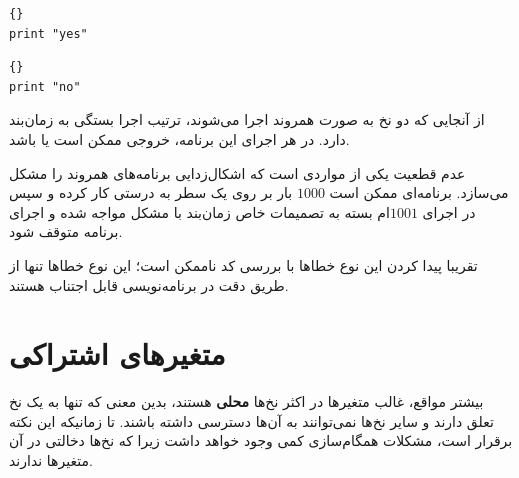 \documentclass{book}
\begin{document}
\begin{latin}
\begin{minipage}[t]{2in}
\begin{latin}
\begin{lstlisting}[title=\rl{نخ \lr{A}}]{}
print "yes"
\end{lstlisting}
\end{latin}
\end{minipage}
\hfill
\begin{minipage}[t]{2in}
\begin{latin}
\begin{lstlisting}[title=\rl{نخ \lr{‌B}}]{}
print "no"
\end{lstlisting}
\end{latin}
\end{minipage}
\end{latin}

    از آنجایی که دو نخ به صورت همروند اجرا می‌شوند، ترتیب اجرا بستگی به زمان‌بند دارد. در هر اجرای این برنامه، خروجی ممکن است 
      یا 
     باشد. 
     
    عدم قطعیت یکی از مواردی است که اشکال‌زدایی برنامه‌های همروند را مشکل می‌سازد. برنامه‌ای ممکن است $1000$ بار بر روی یک سطر به درستی 
    کار کرده و سپس در اجرای $1001$ام بسته به تصمیمات خاص زمان‌بند با مشکل مواجه شده و اجرای برنامه متوقف شود. 
    
    تقریبا پیدا کردن این نوع خطاها با بررسی کد ناممکن است؛  این نوع  خطاها تنها از طریق دقت در برنامه‌نویسی قابل اجتناب هستند. 


\section {متغیرهای اشتراکی}
\label{shared}

    بیشتر مواقع، غالب متغیرها در اکثر نخ‌ها \textbf{محلی} هستند، بدین معنی که تنها به یک نخ تعلق دارند و 
    سایر نخ‌ها نمی‌توانند به آن‌ها دسترسی داشته باشند. تا زمانیکه این نکته برقرار است، مشکلات همگام‌سازی کمی وجود خواهد داشت زیرا که 
    نخ‌ها دخالتی در آن متغیرها ندارند. 
\end{document}
